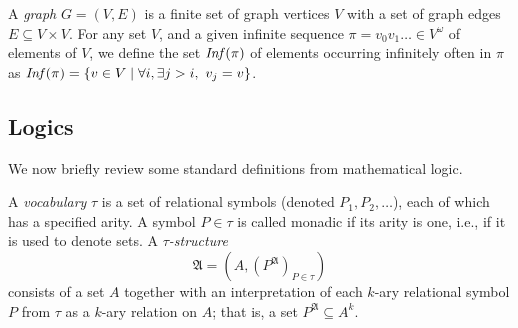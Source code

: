 \documentclass[a4paper,UKenglish,cleveref, autoref, thm-restate]{lipics-v2021}
\begin{document}
A {\em graph} $G=(V,E)$ is a finite set of graph vertices $V$ with a set of graph edges $E \subseteq V \times V$. 
%
For any set $V$, and a given infinite sequence $\pi = v_0 v_1 \ldots \in V^\omega$ of elements of $V$, we define the set 
$\text{\textit{Inf}}(\pi)$ of elements occurring infinitely often in $\pi$ as
$\text{\textit{Inf}}(\pi) = \{ v \in V \mid \forall i, \exists j > i, ~ v_j = v \}$. 






\subsection{Logics}

We now brieﬂy review some standard deﬁnitions from mathematical logic.

\begin{samepage}
\begin{definition}
 A {\em vocabulary} $\tau$ is a set of relational symbols (denoted $P_1, P_2, \ldots $), each of which has a specified
 arity. A symbol $P \in \tau$ is called monadic if its arity is one, i.e., if it is used to
 denote sets.
%
A {\em $\tau$-structure} %
%
$$ \mathfrak{A} = (A,	( P^{\mathfrak{A}} )_{P \in \tau})$$
%
consists of a set $A$ together with an interpretation of
 each $k$-ary relational symbol $P$ from $\tau$ as a $k$-ary relation on $A$; that is, a
set $P^{\mathfrak{A}} \subseteq A^k$.
%
\end{definition}
\end{samepage}


\end{document}
